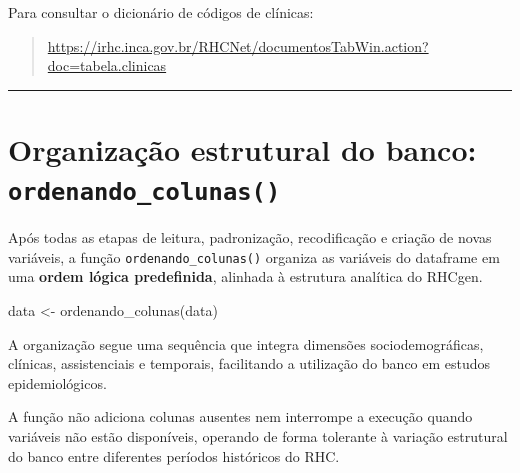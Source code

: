 \documentclass[
  brazilian,
  a4paper,
  oneside]{scrbook}
\newenvironment{Shaded}{\begin{snugshade}}{\end{snugshade}}
\newcommand{\FunctionTok}[1]{\textcolor[rgb]{0.28,0.35,0.67}{#1}}
\newcommand{\NormalTok}[1]{\textcolor[rgb]{0.00,0.23,0.31}{#1}}
\newcommand{\OtherTok}[1]{\textcolor[rgb]{0.00,0.23,0.31}{#1}}
\begin{document}
Para consultar o dicionário de códigos de clínicas:

\begin{quote}
\url{https://irhc.inca.gov.br/RHCNet/documentosTabWin.action?doc=tabela.clinicas}
\end{quote}

\begin{center}\rule{0.5\linewidth}{0.5pt}\end{center}

\section{\texorpdfstring{Organização estrutural do banco:
\texttt{ordenando\_colunas()}}{Organização estrutural do banco: ordenando\_colunas()}}\label{organizauxe7uxe3o-estrutural-do-banco-ordenando_colunas}

Após todas as etapas de leitura, padronização, recodificação e criação
de novas variáveis, a função \texttt{ordenando\_colunas()} organiza as
variáveis do dataframe em uma \textbf{ordem lógica predefinida},
alinhada à estrutura analítica do RHCgen.

\begin{Shaded}
\begin{Highlighting}[]
\NormalTok{data }\OtherTok{\textless{}{-}} \FunctionTok{ordenando\_colunas}\NormalTok{(data)}
\end{Highlighting}
\end{Shaded}

A organização segue uma sequência que integra dimensões
sociodemográficas, clínicas, assistenciais e temporais, facilitando a
utilização do banco em estudos epidemiológicos.

\begin{tcolorbox}[enhanced jigsaw, arc=.35mm, bottomrule=.15mm, bottomtitle=1mm, breakable, colback=white, colbacktitle=quarto-callout-note-color!10!white, colframe=quarto-callout-note-color-frame, coltitle=black, left=2mm, leftrule=.75mm, opacityback=0, opacitybacktitle=0.6, rightrule=.15mm, title=\textcolor{quarto-callout-note-color}{\faInfo}\hspace{0.5em}{Tolerância a variações estruturais}, titlerule=0mm, toprule=.15mm, toptitle=1mm]

A função não adiciona colunas ausentes nem interrompe a execução quando
variáveis não estão disponíveis, operando de forma tolerante à variação
estrutural do banco entre diferentes períodos históricos do RHC.

\end{tcolorbox}
\end{document}

